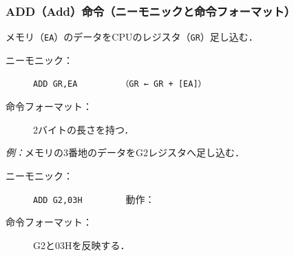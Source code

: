 \documentclass[handout]{beamer}        %
\begin{document}
\begin{frame}
  \frametitle{ADD（Add）命令（ニーモニックと命令フォーマット）}
  メモリ（\texttt{EA}）のデータをCPUのレジスタ（\texttt{GR}）足し込む．

  \begin{description}
  \item[ニーモニック：]\texttt{ADD GR,EA}~~~~~~~~~\texttt{（GR ← GR + [EA]）}
    \vfill

  \item[命令フォーマット：] 2バイトの長さを持つ．\\
  \end{description}
  \vfill

  \emph{例：}メモリの3番地のデータをG2レジスタへ足し込む．
  \begin{description}
  \item[ニーモニック：]\texttt{ADD G2,03H}~~~~~~~~~動作：

  \item[命令フォーマット：] G2と03Hを反映する．\\
  \end{description}
  \vfill
\end{frame}
\end{document}
